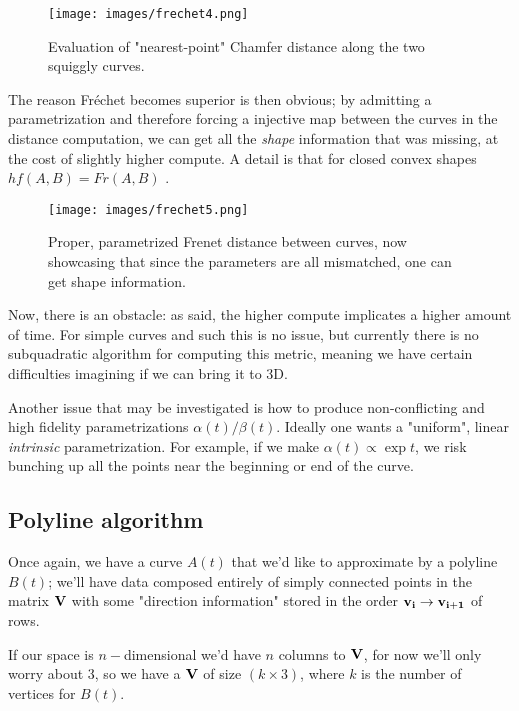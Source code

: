 \begin{figure}[h]
    \centering
    \texttt{[image: images/frechet4.png]}
    \caption{Evaluation of "nearest-point" Chamfer distance along the
    two squiggly curves.}
\end{figure}

The reason Fréchet becomes superior is then obvious; by admitting a parametrization
and therefore forcing a injective map between the curves in the distance computation,
we can get all the \emph{shape} information that was missing, at the cost of
slightly higher compute. A detail is that for closed convex shapes $hf(A,B) = Fr(A,B)$
\cite{frechet3}.

\begin{figure}[h]
    \centering
    \texttt{[image: images/frechet5.png]}
    \caption{Proper, parametrized Frenet distance between curves, now
    showcasing that since the parameters are all mismatched, one can get
    shape information.}
\end{figure}

Now, there is an obstacle: as said, the higher compute implicates a higher
amount of time. For simple curves and such this is no issue, but currently
there is no subquadratic algorithm for computing this metric, meaning we
have certain difficulties imagining if we can bring it to 3D.

\spa

Another issue that may be investigated is how to produce non-conflicting
and high fidelity parametrizations $\alpha(t)/\beta(t)$. Ideally one wants a
"uniform", linear \emph{intrinsic} parametrization. For example, if we make
$\alpha(t) \propto \exp t$, we risk bunching up all the points near the beginning
or end of the curve.


\subsection{Polyline algorithm}

Once again, we have a curve $A(t)$ that we'd like to approximate
by a polyline $B(t)$; we'll have data composed entirely of simply connected
points in the matrix $\bf{V}$ with some "direction information" 
stored in the order $\bf{v_i\rightarrow v_{i+1}}$ of rows.

\spa

If our space is $n-$dimensional we'd have $n$ columns to 
$\bf{V}$, for now we'll only worry about 3, so we have a
$\bf{V}$ of size $(k \times 3)$, where $k$ is the number of
vertices for $B(t)$.



